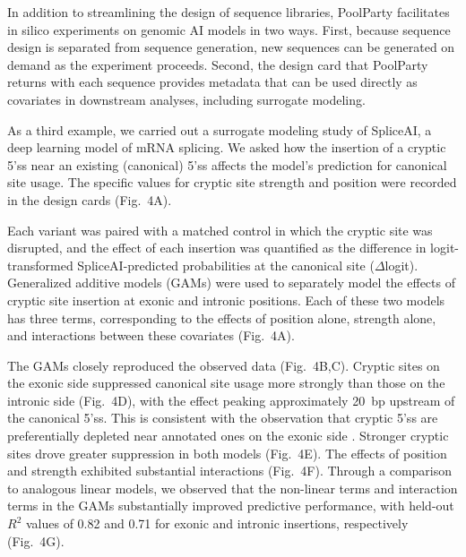 In addition to streamlining the design of sequence libraries, PoolParty facilitates in silico experiments on genomic AI models in two ways. First, because sequence design is separated from sequence generation, new sequences can be generated on demand as the experiment proceeds. Second, the design card that PoolParty returns with each sequence provides metadata that can be used directly as covariates in downstream analyses, including surrogate modeling.

As a third example, we carried out a surrogate modeling study of SpliceAI, a deep learning model of mRNA splicing. We asked how the insertion of a cryptic 5'ss near an existing (canonical) 5'ss affects the model's prediction for canonical site usage.  The specific values for cryptic site strength and position were recorded in the design cards (Fig.~4A).

Each variant was paired with a matched control in which the cryptic site was disrupted, and the effect of each insertion was quantified as the difference in logit-transformed SpliceAI-predicted probabilities at the canonical site ($\Delta$logit). Generalized additive models (GAMs) were used to separately model the effects of cryptic site insertion at exonic and intronic positions. Each of these two models has three terms, corresponding to the effects of position alone, strength alone, and interactions between these covariates (Fig.~4A).

The GAMs closely reproduced the observed data (Fig.~4B,C). Cryptic sites on the exonic side suppressed canonical site usage more strongly than those on the intronic side (Fig.~4D), with the effect peaking approximately 20~bp upstream of the canonical 5'ss. This is consistent with the observation that cryptic 5'ss are preferentially depleted near annotated ones on the exonic side \citep{Dawes2022empirical}. Stronger cryptic sites drove greater suppression in both models (Fig.~4E). The effects of position and strength exhibited substantial interactions (Fig.~4F). Through a comparison to analogous linear models, we observed that the non-linear terms and interaction terms in the GAMs substantially improved predictive performance, with held-out $R^2$ values of 0.82 and 0.71 for exonic and intronic insertions, respectively (Fig.~4G).

